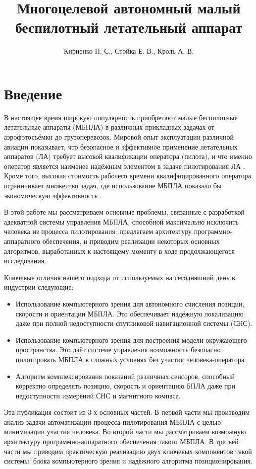 \documentclass[12pt,a4paper]{article}
\title{Многоцелевой автономный малый беспилотный летательный аппарат}
\author{Кириенко П. С., Стойка Е. В., Кроль А. В.}
\affil{Zubax Robotics, г. Москва}
\date{}
\begin{document}
\maketitle

\section{Введение}

В настоящее время широкую популярность приобретают малые беспилотные летательные аппараты (МБПЛА) в различных прикладных задачах от аэрофотосъёмки до грузоперевозок. Мировой опыт эксплуатации различной авиации показывает, что безопасное и эффективное применение летательных аппаратов (ЛА) требует высокой квалификации оператора (пилота), и что именно оператор является наименее надёжным элементом в задаче пилотирования ЛА \cite{RiskManagementHandbookFAA, PlaneCrashInfo, HumanFactorsBoeing}. Кроме того, высокая стоимость рабочего времени квалифицированного оператора ограничивает множество задач, где использование МБПЛА показало бы экономическую эффективность \cite{DroneHire}.

В этой работе мы рассматриваем основные проблемы, связанные с разработкой адекватной системы управления МБПЛА, способной максимально исключить человека из процесса пилотирования; предлагаем архитектуру программно-аппаратного обеспечения, и приводим реализации некоторых основных алгоритмов, выработанных к настоящему моменту в ходе продолжающегося исследования.

Ключевые отличия нашего подхода от используемых на сегодняшний день в индустрии следующие:

\begin{itemize}
    \item Использование компьютерного зрения для автономного счисления позиции, скорости и ориентации МБПЛА. Это обеспечивает надёжную локализацию даже при полной недоступности спутниковой навигационной системы (СНС).
    \item Использование компьютерного зрения для построения модели окружающего пространства. Это даёт системе управления возможность безопасно пилотировать МБПЛА в сложных условиях без участия человека-оператора.
    \item Алгоритм комплексирования показаний различных сенсоров, способный корректно определять позицию, скорость и ориентацию БПЛА даже при недоступности измерений СНС и магнитного компаса.
\end{itemize}

Эта публикация состоит из 3-х основных частей. В первой части мы производим анализ задачи автоматизации процесса пилотирования МБПЛА с целью минимизации участия человека. Во второй части мы рассматриваем возможную архитектуру программно-аппаратного обеспечения такого МБПЛА. В третьей части мы приводим практическую реализацию двух ключевых компонентов такой системы: блока компьютерного зрения и надёжного алгоритма позиционирования.
\end{document}
